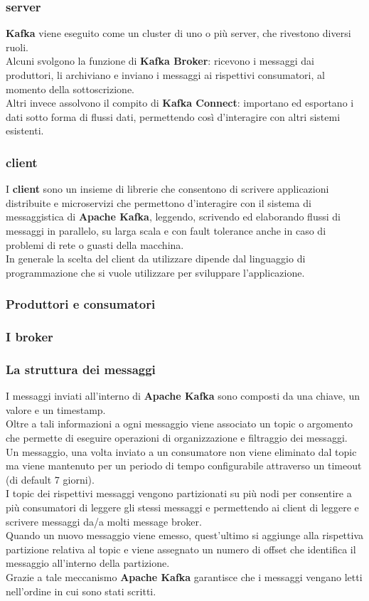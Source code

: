 \subsubsection{server}
\textbf{Kafka} viene eseguito come un cluster di uno o più server, che rivestono diversi ruoli. \\Alcuni svolgono la funzione di \textbf{Kafka Broker}: ricevono i messaggi dai produttori, li archiviano e inviano i messaggi ai rispettivi consumatori, al momento della sottoscrizione.
\\ Altri invece assolvono il compito di \textbf{Kafka Connect}: importano ed esportano i
dati sotto forma di flussi dati, permettendo così  d'interagire con altri sistemi esistenti.
\subsubsection{client}
I \textbf{client} sono un insieme di librerie che consentono di scrivere applicazioni distribuite e microservizi che permettono d'interagire con
il sistema di messaggistica di \textbf{Apache Kafka}, leggendo, scrivendo ed elaborando flussi di messaggi in parallelo, su larga scala e con \gls{fault tolerance}{} anche in caso di
problemi di rete o guasti della macchina.\\
In generale la scelta del client da utilizzare dipende dal linguaggio di programmazione che si vuole utilizzare per sviluppare l'applicazione.\\ 
\subsubsection{Produttori e consumatori}
\subsubsection{I broker}

\subsubsection{La struttura dei messaggi}
I messaggi inviati all'interno di \textbf{Apache Kafka} sono composti da una chiave, un valore e un timestamp. \\
Oltre a tali informazioni a ogni messaggio viene associato un \gls{topic} o argomento che permette di eseguire operazioni di organizzazione 
e filtraggio dei messaggi.\\
Un messaggio, una volta inviato a un consumatore non viene eliminato dal \gls{topic}{} ma viene mantenuto per un periodo di tempo configurabile attraverso un timeout (di default 7 giorni).\\
I \gls{topic}{} dei rispettivi messaggi vengono partizionati su più nodi per consentire a più consumatori di leggere gli stessi messaggi e permettendo ai client di leggere e scrivere messaggi da/a molti \gls{message broker}{}.\\
Quando un nuovo messaggio viene emesso, quest'ultimo si aggiunge alla rispettiva partizione relativa al \gls{topic}{} e viene assegnato un numero di offset che identifica il messaggio all'interno della partizione.\\
Grazie a tale meccanismo \textbf{Apache Kafka} garantisce che i messaggi vengano letti nell'ordine in cui sono stati scritti.
